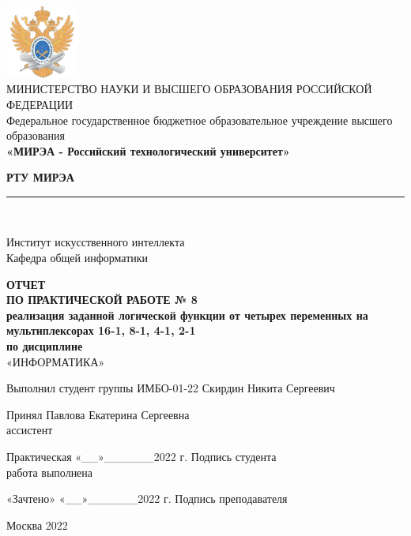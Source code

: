 \documentclass[14pt, a4paper]{extreport}
\newcommand{\doublerule}[1][.4pt]{%
	\noindent
	\makebox[0pt][l]{\rule[.6ex]{\linewidth}{#1}}%
	\rule[.3ex]{\linewidth}{#1}
}
\begin{document}
\begin{titlepage}
	\begin{center}
		\vspace*{0.5mm}

		\includegraphics[width=0.18\textwidth]{logo}\\
		\footnotesize
		МИНИСТЕРСТВО НАУКИ И ВЫСШЕГО ОБРАЗОВАНИЯ РОССИЙСКОЙ ФЕДЕРАЦИИ\\
		\small
		Федеральное государственное бюджетное образовательное учреждение высшего образования\\
		\textbf{«МИРЭА - Российский технологический университет»}
		\vspace{0.5cm}

		\large \textbf{РТУ МИРЭА} \normalsize

		\doublerule[1pt]\\
		\vspace{0.4cm}

		Институт искусственного интеллекта\\
		Кафедра общей информатики
		\vspace{1.5cm}

		\textbf{ОТЧЕТ}\\
		\textbf{ПО ПРАКТИЧЕСКОЙ РАБОТЕ № 8}\\
		\textbf{реализация заданной логической функции от четырех переменных на мультиплексорах 16-1, 8-1, 4-1, 2-1}\\
		\textbf{по дисциплине}\\
		«ИНФОРМАТИКА»
		\vspace{1.5cm}

		\small
		Выполнил студент группы ИМБО-01-22 \hfill Скирдин Никита Сергеевич
		\vspace{1cm}

		Принял \hfill Павлова Екатерина Сергеевна\\
		ассистент \hfill
		\vspace{1.5cm}

		\footnotesize
		\hspace{0.5cm} Практическая \hfill «\_\_»\_\_\_\_\_\_2022 г. \hfill Подпись студента\\
		\hspace{0.5cm} работа выполнена \hfill
		\vspace{0.5cm}

		\hspace{2cm} «Зачтено» \hfill «\_\_»\_\_\_\_\_\_2022 г. \hfill Подпись преподавателя
		\vfill

		\small
		Москва 2022
	\end{center}
	\thispagestyle{empty}
\end{titlepage}
\end{document}
